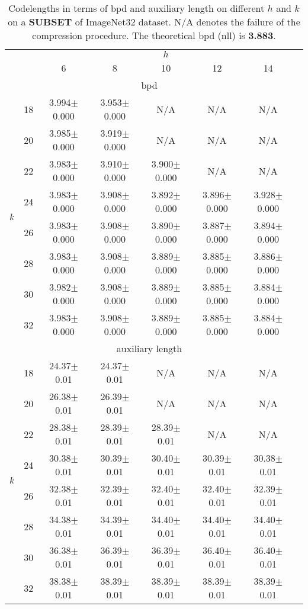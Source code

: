 \documentclass{article}
\newcommand{\ebar}[1]{{\tiny $\pm$#1}}
\begin{document}
\begin{table}[ht]
\centering
\caption{Codelengths in terms of bpd and auxiliary length on different $h$ and $k$ on a \textbf{SUBSET} of ImageNet32 dataset. N/A denotes the failure of the compression procedure. The theoretical bpd (nll) is \textbf{3.883}.}
\small
\label{tab:hparam_img32}
\begin{tabular}{cccccccc}
\toprule
    & & \multicolumn{5}{c}{$h$} \\
     &  & 6 & 8 & 10 & 12 & 14 \\
    \midrule
    \multicolumn{7}{c}{bpd} \\
    \midrule
    \multirow{8}{*}{$k$} & 18 & 3.994\ebar{0.000} & 3.953\ebar{0.000} & N/A & N/A & N/A \\
        & 20 & 3.985\ebar{0.000} & 3.919\ebar{0.000} & N/A & N/A & N/A \\
        & 22 & 3.983\ebar{0.000} & 3.910\ebar{0.000} & 3.900\ebar{0.000} & N/A & N/A \\
        & 24 & 3.983\ebar{0.000} & 3.908\ebar{0.000} & 3.892\ebar{0.000} & 3.896\ebar{0.000} & 3.928\ebar{0.000} \\
        & 26 & 3.983\ebar{0.000} & 3.908\ebar{0.000} & 3.890\ebar{0.000} & 3.887\ebar{0.000} & 3.894\ebar{0.000} \\
        & 28 & 3.983\ebar{0.000} & 3.908\ebar{0.000} & 3.889\ebar{0.000} & 3.885\ebar{0.000} & 3.886\ebar{0.000} \\
        & 30 & 3.982\ebar{0.000} & 3.908\ebar{0.000} & 3.889\ebar{0.000} & 3.885\ebar{0.000} & 3.884\ebar{0.000} \\
        & 32 & 3.983\ebar{0.000} & 3.908\ebar{0.000} & 3.889\ebar{0.000} & 3.885\ebar{0.000} & 3.884\ebar{0.000} \\
    \midrule
    \multicolumn{7}{c}{auxiliary length} \\
    \midrule
    \multirow{8}{*}{$k$} & 18 & 24.37\ebar{0.01} & 24.37\ebar{0.01} & N/A & N/A & N/A \\
        & 20 & 26.38\ebar{0.01} & 26.39\ebar{0.01} & N/A & N/A & N/A \\
        & 22 & 28.38\ebar{0.01} & 28.39\ebar{0.01} & 28.39\ebar{0.01} & N/A & N/A \\
        & 24 & 30.38\ebar{0.01} & 30.39\ebar{0.01} & 30.40\ebar{0.01} & 30.39\ebar{0.01} & 30.38\ebar{0.01} \\
        & 26 & 32.38\ebar{0.01} & 32.39\ebar{0.01} & 32.40\ebar{0.01} & 32.40\ebar{0.01} & 32.39\ebar{0.01} \\
        & 28 & 34.38\ebar{0.01} & 34.39\ebar{0.01} & 34.40\ebar{0.01} & 34.40\ebar{0.01} & 34.40\ebar{0.01} \\
        & 30 & 36.38\ebar{0.01} & 36.39\ebar{0.01} & 36.39\ebar{0.01} & 36.40\ebar{0.01} & 36.40\ebar{0.01} \\
        & 32 & 38.38\ebar{0.01} & 38.39\ebar{0.01} & 38.39\ebar{0.01} & 38.39\ebar{0.01} & 38.39\ebar{0.01} \\
\bottomrule
\end{tabular}
\end{table}
\end{document}
